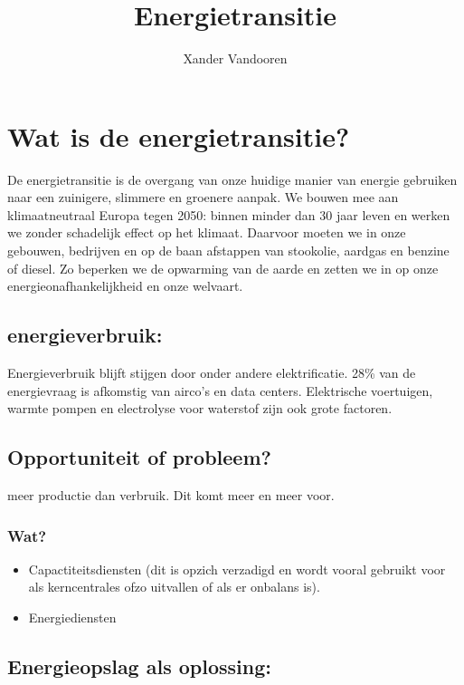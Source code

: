 \documentclass[12pt]{article}
\begin{document}
\begin{titlepage}
    \author{Xander Vandooren}
    \title{Energietransitie}
\end{titlepage}
\maketitle
\newpage
\tableofcontents
\newpage
{}
\section{Wat is de energietransitie?}
De energietransitie is de overgang van onze huidige manier van energie gebruiken naar een zuinigere, slimmere en groenere aanpak. We bouwen mee aan klimaatneutraal Europa tegen 2050: binnen minder dan 30 jaar leven en werken we zonder schadelijk effect op het klimaat. Daarvoor moeten we in onze gebouwen, bedrijven en op de baan afstappen van stookolie, aardgas en benzine of diesel. Zo beperken we de opwarming van de aarde en zetten we in op onze energieonafhankelijkheid en onze welvaart.
\subsection{energieverbruik:}
Energieverbruik blijft stijgen door onder andere elektrificatie. 28\% van de energievraag is afkomstig van airco's en data centers. Elektrische voertuigen, warmte pompen en electrolyse voor waterstof zijn ook grote factoren.
\subsection{Opportuniteit of probleem?}
meer productie dan verbruik. Dit komt meer en meer voor.
\subsubsection{Wat?}
\begin{itemize}
    \item Capactiteitsdiensten (dit is opzich verzadigd en wordt vooral gebruikt voor als kerncentrales ofzo uitvallen of als er onbalans is).
    \item Energiediensten
\end{itemize}
\subsection{Energieopslag als oplossing:}
\end{document}
